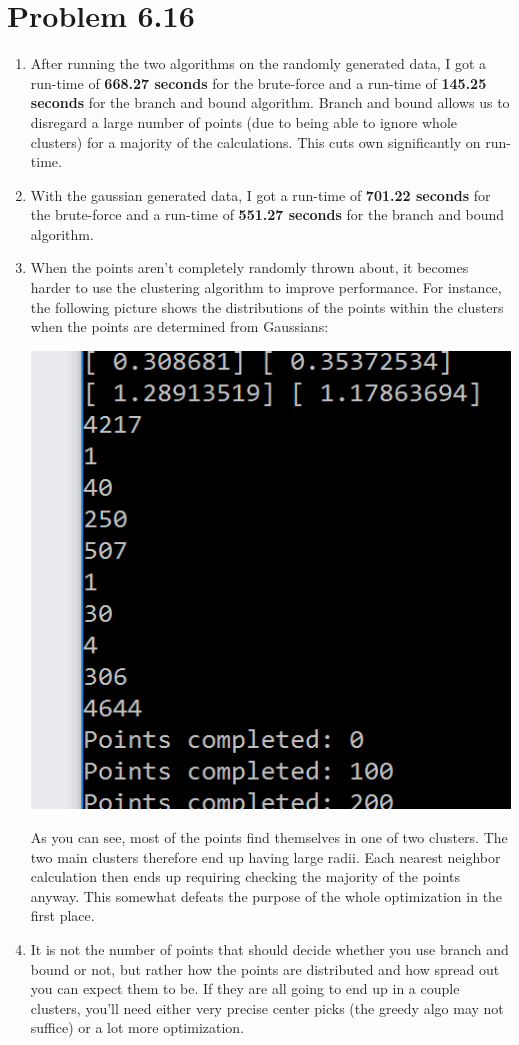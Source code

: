 \documentclass[12pt]{article}
\begin{document}
\section*{Problem 6.16}
\begin{enumerate}[label=(\alph*)]
	\item After running the two algorithms on the randomly generated data, I got a run-time of \textbf{668.27 seconds} for the brute-force and a run-time of \textbf{145.25 seconds} for the branch and bound algorithm. Branch and bound allows us to disregard a large number of points (due to being able to ignore whole clusters) for a majority of the calculations. This cuts own significantly on run-time.
	\item With the gaussian generated data, I got a run-time of \textbf{701.22 seconds} for the brute-force and a run-time of \textbf{551.27 seconds} for the branch and bound algorithm.
	\item When the points aren't completely randomly thrown about, it becomes harder to use the clustering algorithm to improve performance. For instance, the following picture shows the distributions of the points within the clusters when the points are determined from Gaussians:
	
	\includegraphics[scale=0.6]{6-16-1.png}
	
	As you can see, most of the points find themselves in one of two clusters. The two main clusters therefore end up having large radii. Each nearest neighbor calculation then ends up requiring checking the majority of the points anyway. This somewhat defeats the purpose of the whole optimization in the first place.
	\item It is not the number of points that should decide whether you use branch and bound or not, but rather how the points are distributed and how spread out you can expect them to be. If they are all going to end up in a couple clusters, you'll need either very precise center picks (the greedy algo may not suffice) or a lot more optimization.
\end{enumerate}
\end{document}
